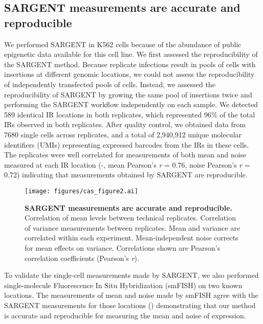 \subsection{SARGENT measurements are accurate and reproducible}

We performed SARGENT in K562 cells because of the abundance of public epigenetic data available for this cell line. We first assessed the reproducibility of the SARGENT method. Because replicate infections result in pools of cells with insertions at different genomic locations, we could not assess the reproducibility of independently transfected pools of cells. Instead, we assessed the reproducibility of SARGENT by growing the same pool of insertions twice and performing the SARGENT workflow independently on each sample. We detected 589 identical IR locations in both replicates, which represented 96\% of the total IRs observed in both replicates. After quality control, we obtained data from 7680 single cells across replicates, and a total of 2,940,912 unique molecular identifiers (UMIs) representing expressed barcodes from the IRs in these cells. The replicates were well correlated for measurements of both mean and noise measured at each IR location (-, mean Pearson’s \textit{r} = 0.76, noise Pearson’s \textit{r} = 0.72) indicating that measurements obtained by SARGENT are reproducible.

\begin{figure}[tb]  
    \centering
    \texttt{[image: figures/cas\_figure2.ai]}
    \caption[SARGENT measurements are accurate and reproducible.]{%
        \textbf{SARGENT measurements are accurate and reproducible.}
        Correlation of mean levels between technical replicates.
        Correlation of variance measurements between replicates.
        Mean and variance are correlated within each experiment.
        Mean-independent noise corrects for mean effects on variance. Correlations shown are Pearson’s correlation coefficients (Pearson’s \textit{r}). 
    }
    \label{fig:cas_figure2}
\end{figure}

To validate the single-cell measurements made by SARGENT, we also performed single-molecule Fluorescence In Situ Hybridization (smFISH) on two known locations. The measurements of mean and noise made by smFISH agree with the SARGENT measurements for those locations () demonstrating that our method is accurate and reproducible for measuring the mean and noise of expression. 

